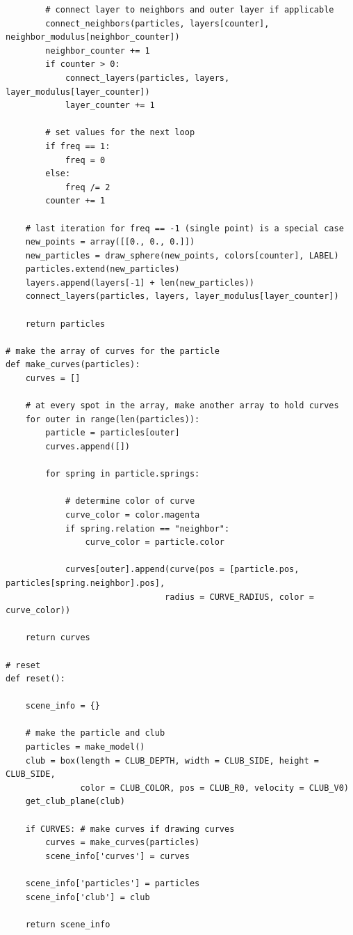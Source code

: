 \documentclass{article}
\begin{document}
\begin{verbatim}
        # connect layer to neighbors and outer layer if applicable
        connect_neighbors(particles, layers[counter], neighbor_modulus[neighbor_counter])
        neighbor_counter += 1
        if counter > 0:
            connect_layers(particles, layers, layer_modulus[layer_counter])
            layer_counter += 1
        
        # set values for the next loop
        if freq == 1:
            freq = 0
        else:
            freq /= 2
        counter += 1

    # last iteration for freq == -1 (single point) is a special case
    new_points = array([[0., 0., 0.]])
    new_particles = draw_sphere(new_points, colors[counter], LABEL)
    particles.extend(new_particles)
    layers.append(layers[-1] + len(new_particles))
    connect_layers(particles, layers, layer_modulus[layer_counter])

    return particles

# make the array of curves for the particle
def make_curves(particles):
    curves = []

    # at every spot in the array, make another array to hold curves
    for outer in range(len(particles)):
        particle = particles[outer]
        curves.append([])
        
        for spring in particle.springs:

            # determine color of curve
            curve_color = color.magenta
            if spring.relation == "neighbor":
                curve_color = particle.color
            
            curves[outer].append(curve(pos = [particle.pos, particles[spring.neighbor].pos],
                                radius = CURVE_RADIUS, color = curve_color))

    return curves

# reset
def reset():
    
    scene_info = {}

    # make the particle and club
    particles = make_model()
    club = box(length = CLUB_DEPTH, width = CLUB_SIDE, height = CLUB_SIDE,
               color = CLUB_COLOR, pos = CLUB_R0, velocity = CLUB_V0)
    get_club_plane(club)

    if CURVES: # make curves if drawing curves
        curves = make_curves(particles)
        scene_info['curves'] = curves

    scene_info['particles'] = particles
    scene_info['club'] = club
    
    return scene_info


\end{verbatim}
\end{document}
